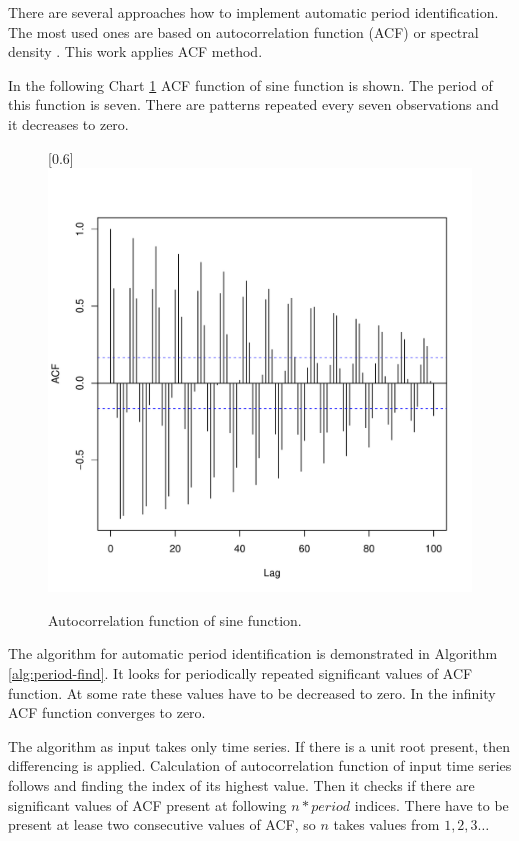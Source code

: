     There are several approaches how to implement automatic period identification. The most used ones are based on
    autocorrelation function (ACF) or spectral density \cite{period-hydman}. This work applies ACF method.

    In the following Chart \ref{img:period-acf} ACF function of sine function is shown. The period of this
    function is seven. There are patterns repeated every seven observations and it decreases to zero.

    \begin{figure}[H]
        \begin{center}
            \scalebox{0.73}[0.6]{\includegraphics{img/acf-sine.pdf}}
            \caption{Autocorrelation function of sine function.}
            \label{img:period-acf}
        \end{center}
    \end{figure}

    The algorithm for automatic period identification is demonstrated in Algorithm \ref{alg:period-find}.
    It looks for periodically repeated significant values of ACF function. At some rate these values have to
    be decreased to zero. In the infinity ACF function converges to zero.

    The algorithm as input takes only time series. If there is a unit root present, then differencing is applied.
    Calculation of autocorrelation function of input time series follows and finding the index of its highest
    value. Then it checks if there are significant values of ACF present at following $n*period$ indices.
    There have to be present at lease two consecutive values of ACF, so $n$ takes values from $1,2,3\dots$

